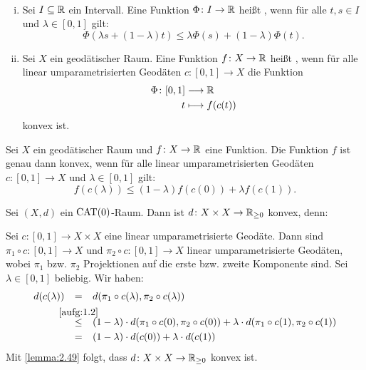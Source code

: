\begin{definition}[konvex]
\label{def:2.48}
	\mbox{} \\[-1.4cm]
	\begin{enumerate}[(i)]
		\item Sei $I \subseteq \mathbb{R}$ ein Intervall.
		Eine Funktion $\Phi\colon I \rightarrow \mathbb{R}$ heißt , wenn für alle $t,s \in I$ und $\lambda \in [0,1]$ gilt: 
		\[
			\Phi(\lambda s + (1-\lambda)t) \leq \lambda \Phi(s) + (1-\lambda)\Phi(t).
		\]
		\item Sei $X$ ein geodätischer Raum.
		Eine Funktion $f \colon X \rightarrow \mathbb{R}$ heißt , wenn für alle linear umparametrisierten Geodäten $c \colon [0,1] \rightarrow X$ die Funktion
		\begin{align*}
			\Phi \colon [0,1] &\longrightarrow \mathbb{R} \\
			t &\longmapsto f(c(t))
		\end{align*}
		konvex ist.
	\end{enumerate}
\end{definition}
\newpage
\begin{lemma}
\label{lemma:2.49}
	Sei $X$ ein geodätischer Raum und $f \colon X \rightarrow \mathbb{R}$ eine Funktion.
	Die Funktion $f$ ist genau dann konvex, wenn für alle linear umparametrisierten Geodäten $c \colon [0,1] \rightarrow X$ und $\lambda \in [0,1]$ gilt:
	\[
		f(c(\lambda)) \leq (1-\lambda) f(c(0)) + \lambda f(c(1)).
	\]
\end{lemma}

\begin{beispiel}
\label{bsp:2.50}
	Sei $(X,d)$ ein $\operatorname{CAT(0)}$-Raum.
	Dann ist $d\colon X \times X \rightarrow \mathbb{R}_{\geq 0}$ konvex, denn:
	
	Sei $c \colon [0,1] \rightarrow X \times X$ eine linear umparametrisierte Geodäte.
	Dann sind $\pi_1 \circ c \colon [0,1] \rightarrow X$  und $\pi_2 \circ c \colon [0,1] \rightarrow X$ linear umparametrisierte Geodäten, wobei $\pi_1$ bzw. $\pi_2$ Projektionen auf die erste bzw. zweite Komponente sind.
	Sei $\lambda \in [0,1]$ beliebig.
	Wir haben:
	\begin{align*}
		d(c(\lambda)) &\stack{}{=} d(\pi_1 \circ c(\lambda), \pi_2 \circ c(\lambda)) \\
		&\stack{\ref{aufg:1.2}}{\leq} (1-\lambda) \cdot d(\pi_1 \circ c(0),\pi_2 \circ c(0)) + \lambda \cdot d(\pi_1 \circ c(1), \pi_2 \circ c(1)) \\
		&\stack{}{=} (1-\lambda) \cdot d(c(0)) + \lambda \cdot d(c(1))
	\end{align*}
	Mit \autoref{lemma:2.49} folgt, dass $d \colon X \times X \rightarrow \mathbb{R}_{\geq 0}$ konvex ist.
\end{beispiel}

